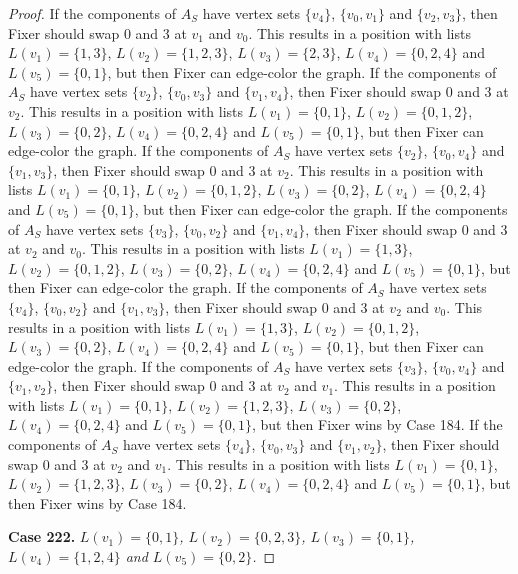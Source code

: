 \documentclass[12pt]{amsart}
\theoremstyle{plain}
\theoremstyle{definition}
\theoremstyle{remark}
\begin{document}
\begin{proof}
If the components of $A_S$ have vertex sets $\{v_4\}$, $\{v_0, v_1\}$ and $\{v_2, v_3\}$, then Fixer should swap 0 and 3 at $v_1$ and $v_0$. This results in a position with lists $L(v_1) = \{1, 3\}$, $L(v_2) = \{1, 2, 3\}$, $L(v_3) = \{2, 3\}$, $L(v_4) = \{0, 2, 4\}$ and $L(v_5) = \{0, 1\}$, but then Fixer can edge-color the graph.
If the components of $A_S$ have vertex sets $\{v_2\}$, $\{v_0, v_3\}$ and $\{v_1, v_4\}$, then Fixer should swap 0 and 3 at $v_2$. This results in a position with lists $L(v_1) = \{0, 1\}$, $L(v_2) = \{0, 1, 2\}$, $L(v_3) = \{0, 2\}$, $L(v_4) = \{0, 2, 4\}$ and $L(v_5) = \{0, 1\}$, but then Fixer can edge-color the graph.
If the components of $A_S$ have vertex sets $\{v_2\}$, $\{v_0, v_4\}$ and $\{v_1, v_3\}$, then Fixer should swap 0 and 3 at $v_2$. This results in a position with lists $L(v_1) = \{0, 1\}$, $L(v_2) = \{0, 1, 2\}$, $L(v_3) = \{0, 2\}$, $L(v_4) = \{0, 2, 4\}$ and $L(v_5) = \{0, 1\}$, but then Fixer can edge-color the graph.
If the components of $A_S$ have vertex sets $\{v_3\}$, $\{v_0, v_2\}$ and $\{v_1, v_4\}$, then Fixer should swap 0 and 3 at $v_2$ and $v_0$. This results in a position with lists $L(v_1) = \{1, 3\}$, $L(v_2) = \{0, 1, 2\}$, $L(v_3) = \{0, 2\}$, $L(v_4) = \{0, 2, 4\}$ and $L(v_5) = \{0, 1\}$, but then Fixer can edge-color the graph.
If the components of $A_S$ have vertex sets $\{v_4\}$, $\{v_0, v_2\}$ and $\{v_1, v_3\}$, then Fixer should swap 0 and 3 at $v_2$ and $v_0$. This results in a position with lists $L(v_1) = \{1, 3\}$, $L(v_2) = \{0, 1, 2\}$, $L(v_3) = \{0, 2\}$, $L(v_4) = \{0, 2, 4\}$ and $L(v_5) = \{0, 1\}$, but then Fixer can edge-color the graph.
If the components of $A_S$ have vertex sets $\{v_3\}$, $\{v_0, v_4\}$ and $\{v_1, v_2\}$, then Fixer should swap 0 and 3 at $v_2$ and $v_1$. This results in a position with lists $L(v_1) = \{0, 1\}$, $L(v_2) = \{1, 2, 3\}$, $L(v_3) = \{0, 2\}$, $L(v_4) = \{0, 2, 4\}$ and $L(v_5) = \{0, 1\}$, but then Fixer wins by Case 184.
If the components of $A_S$ have vertex sets $\{v_4\}$, $\{v_0, v_3\}$ and $\{v_1, v_2\}$, then Fixer should swap 0 and 3 at $v_2$ and $v_1$. This results in a position with lists $L(v_1) = \{0, 1\}$, $L(v_2) = \{1, 2, 3\}$, $L(v_3) = \{0, 2\}$, $L(v_4) = \{0, 2, 4\}$ and $L(v_5) = \{0, 1\}$, but then Fixer wins by Case 184.

\noindent\textbf{Case 222.  }\textit{$L(v_1) = \{0, 1\}$, $L(v_2) = \{0, 2, 3\}$, $L(v_3) = \{0, 1\}$, $L(v_4) = \{1, 2, 4\}$ and $L(v_5) = \{0, 2\}$.}


\end{proof}
\end{document}
